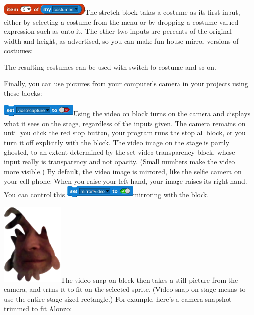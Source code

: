 \includegraphics[width=1.72222in,height=0.22917in]{media/image809.png}The
stretch block takes a costume as its first input, either by selecting a
costume from the menu or by dropping a costume-valued expression such as
onto it. The other two inputs are percents of the original width and
height, as advertised, so you can make fun house mirror versions of
costumes:

The resulting costumes can be used with switch to costume and so on.

Finally, you can use pictures from your computer's camera in your
projects using these blocks:

\includegraphics[width=1.47222in,height=0.24306in]{media/image813.png}Using
the video on block turns on the camera and displays what it sees on the
stage, regardless of the inputs given. The camera remains on until you
click the red stop button, your program runs the stop all block, or you
turn it off explicitly with the block. The video image on the stage is
partly ghosted, to an extent determined by the set video transparency
block, whose input really is transparency and not opacity. (Small
numbers make the video more visible.) By default, the video image is
mirrored, like the selfie camera on your cell phone: When you raise your
left hand, your image raises its right hand. You can control this
\includegraphics[width=1.40278in,height=0.24306in]{media/image814.png}mirroring
with the block.

\includegraphics[width=1.20417in,height=1.6125in]{media/image815.png}The
video snap on block then takes a still picture from the camera, and
trims it to fit on the selected sprite. (Video snap on stage means to
use the entire stage-sized rectangle.) For example, here's a camera
snapshot trimmed to fit Alonzo:

